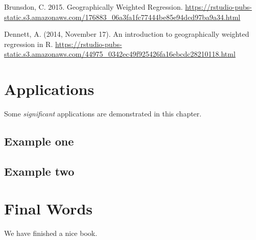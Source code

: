 \documentclass[
]{book}
\begin{document}
Brunsdon, C. 2015. Geographically Weighted Regression. \url{https://rstudio-pubs-static.s3.amazonaws.com/176883_06a3fa1fc77444be85e94dcd97ba9a34.html}

Dennett, A. (2014, November 17). An introduction to geographically weighted regression in R. \url{https://rstudio-pubs-static.s3.amazonaws.com/44975_0342ec49f925426fa16ebcdc28210118.html}

\hypertarget{applications}{%
\chapter{Applications}\label{applications}}

Some \emph{significant} applications are demonstrated in this chapter.

\hypertarget{example-one}{%
\section{Example one}\label{example-one}}

\hypertarget{example-two}{%
\section{Example two}\label{example-two}}

\hypertarget{final-words}{%
\chapter{Final Words}\label{final-words}}

We have finished a nice book.

  
\end{document}
